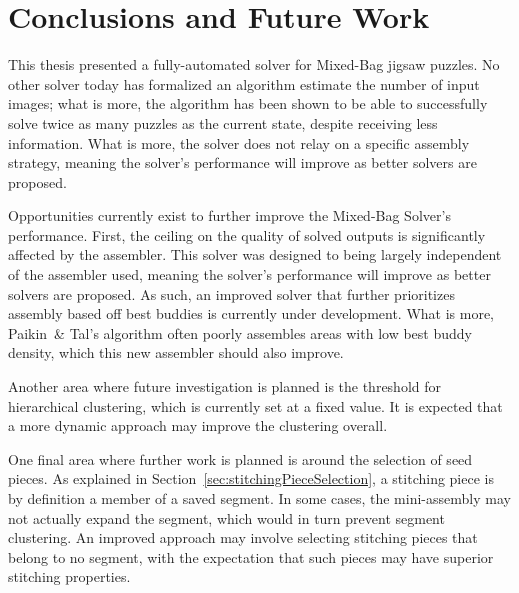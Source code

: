 \chapter{Conclusions and Future Work}

This thesis presented a fully-automated solver for Mixed-Bag jigsaw puzzles.  No other solver today has formalized an algorithm estimate the number of input images; what is more, the algorithm has been shown to be able to successfully solve twice as many puzzles as the current state, despite receiving less information.  What is more, the solver does not relay on a specific assembly strategy, meaning the solver's performance will improve as better solvers are proposed. 

Opportunities currently exist to further improve the Mixed-Bag Solver's performance.  First, the ceiling on the quality of solved outputs is significantly affected by the assembler.  This solver was designed to being largely independent of the assembler used, meaning the solver's performance will improve as better solvers are proposed. As such, an improved solver that further prioritizes assembly based off best buddies is currently under development.  What is more, Paikin~\& Tal's algorithm often poorly assembles areas with low best buddy density, which this new assembler should also improve.

Another area where future investigation is planned is the threshold for hierarchical clustering, which is currently set at a fixed value.  It is expected that a more dynamic approach may improve the clustering overall.

One final area where further work is planned is around the selection of seed pieces.  As explained in Section~\ref{sec:stitchingPieceSelection}, a stitching piece is by definition a member of a saved segment.  In some cases, the mini-assembly may not actually expand the segment, which would in turn prevent segment clustering. An improved approach may involve selecting stitching pieces that belong to no segment, with the expectation that such pieces may have superior stitching properties.